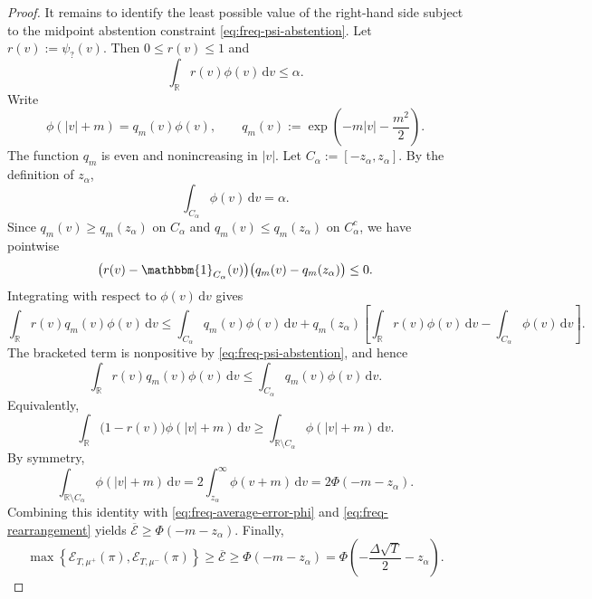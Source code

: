 \documentclass[10pt]{article}
\newcommand{\dd}{\mathrm{d}}
\theoremstyle{plain}
\begin{document}
\begin{proof}
It remains to identify the least possible value of the right-hand side subject
to the midpoint abstention constraint \eqref{eq:freq-psi-abstention}. Let $r(v):=\psi_?(v)$.
Then $0\le r(v)\le1$ and
\[
    \int_{\mathbb R}r(v)\phi(v)\,\dd v\le\alpha .
\]
Write
\[
    \phi(|v|+m)
    =
    q_m(v)\phi(v),
    \qquad
    q_m(v):=
    \exp\!\left(-m|v|-\frac{m^2}{2}\right).
\]
The function $q_m$ is even and nonincreasing in $|v|$. Let $C_\alpha:=[-z_\alpha,z_\alpha]$.
By the definition of $z_\alpha$,
\[
    \int_{C_\alpha}\phi(v)\,\dd v=\alpha .
\]
Since $q_m(v)\ge q_m(z_\alpha)$ on $C_\alpha$ and
$q_m(v)\le q_m(z_\alpha)$ on $C_\alpha^c$, we have pointwise
\[
    \bigl(r(v)-\mathbbm{1}_{C_\alpha}(v)\bigr)
    \bigl(q_m(v)-q_m(z_\alpha)\bigr)
    \le 0 .
\]
Integrating with respect to $\phi(v)\,\dd v$ gives
\[
    \int_{\mathbb R} r(v)q_m(v)\phi(v)\,\dd v
    \le
    \int_{C_\alpha}q_m(v)\phi(v)\,\dd v
    +
    q_m(z_\alpha)
    \left[
        \int_{\mathbb R}r(v)\phi(v)\,\dd v
        -
        \int_{C_\alpha}\phi(v)\,\dd v
    \right].
\]
The bracketed term is nonpositive by \eqref{eq:freq-psi-abstention}, and hence
\[
    \int_{\mathbb R} r(v)q_m(v)\phi(v)\,\dd v
    \le
    \int_{C_\alpha}q_m(v)\phi(v)\,\dd v .
\]
Equivalently,
\begin{equation}
\label{eq:freq-rearrangement}
    \int_{\mathbb R}
    \bigl(1-r(v)\bigr)\phi(|v|+m)\,\dd v
    \ge
    \int_{\mathbb R\setminus C_\alpha}\phi(|v|+m)\,\dd v .
\end{equation}
By symmetry,
\[
    \int_{\mathbb R\setminus C_\alpha}\phi(|v|+m)\,\dd v
    =
    2\int_{z_\alpha}^{\infty}\phi(v+m)\,\dd v
    =
    2\Phi(-m-z_\alpha).
\]
Combining this identity with \eqref{eq:freq-average-error-phi} and
\eqref{eq:freq-rearrangement} yields $\overline{\mathcal E}
    \ge
    \Phi(-m-z_\alpha)$.
Finally,
\[
    \max\left\{
        \mathcal E_{T,\mu^+}(\pi),
        \mathcal E_{T,\mu^-}(\pi)
    \right\}
    \ge
    \overline{\mathcal E}
    \ge
    \Phi(-m-z_\alpha)
    =\Phi\!\left(
        -\frac{\Delta\sqrt T}{2}-z_\alpha
    \right). 
\]

\end{proof}
\end{document}
